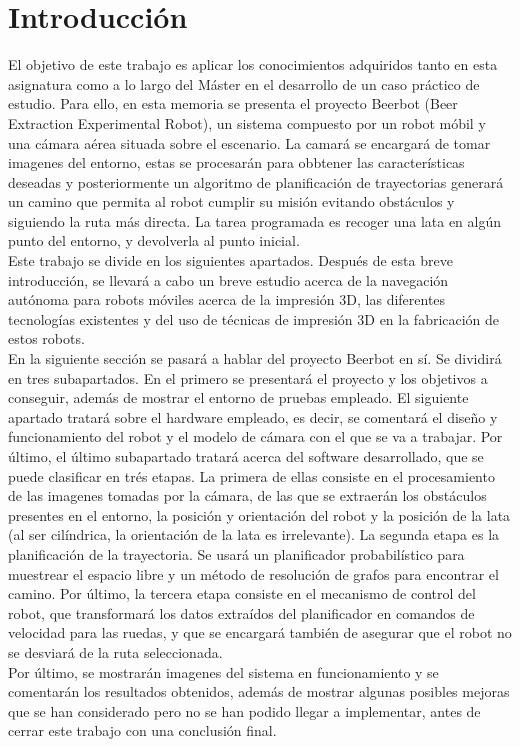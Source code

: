 \chapter{Introducción}
\label{introducción}

El objetivo de este trabajo es aplicar los conocimientos adquiridos tanto en esta asignatura como a lo largo del Máster en el desarrollo de un caso práctico de estudio. Para ello, en esta memoria se presenta el proyecto Beerbot (Beer Extraction Experimental Robot), un sistema compuesto por un robot móbil y una cámara aérea situada sobre el escenario. La camará se encargará de tomar imagenes del entorno, estas se procesarán para obbtener las características deseadas y posteriormente un algoritmo de planificación de trayectorias generará un camino que permita al robot cumplir su misión evitando obstáculos y siguiendo la ruta más directa. La tarea programada es recoger una lata en algún punto del entorno, y devolverla al punto inicial.\\

Este trabajo se divide en los siguientes apartados. Después de esta breve introducción, se llevará a cabo un breve estudio acerca de la navegación autónoma para robots móviles acerca de la impresión 3D, las diferentes tecnologías existentes y del uso de técnicas de impresión 3D en la fabricación de estos robots.\\

En la siguiente sección se pasará a hablar del proyecto Beerbot en sí. Se dividirá en tres subapartados. En el primero se presentará el proyecto y los objetivos a conseguir, además de mostrar el entorno de pruebas empleado. El siguiente apartado tratará sobre el hardware empleado, es decir, se comentará el diseño y funcionamiento del robot y el modelo de cámara con el que se va a trabajar. Por último, el último subapartado tratará acerca del software desarrollado, que se puede clasificar en trés etapas. La primera de ellas consiste en el procesamiento de las imagenes tomadas por la cámara, de las que se extraerán los obstáculos presentes en el entorno, la posición y orientación del robot y la posición de la lata (al ser cilíndrica, la orientación de la lata es irrelevante). La segunda etapa es la planificación de la trayectoria. Se usará un planificador probabilístico para muestrear el espacio libre y un método de resolución de grafos para encontrar el camino. Por último, la tercera etapa consiste en el mecanismo de control del robot, que transformará los datos extraídos del planificador en comandos de velocidad para las ruedas, y que se encargará también de asegurar que el robot no se desviará de la ruta seleccionada.\\

Por último, se mostrarán imagenes del sistema en funcionamiento y se comentarán los resultados obtenidos, además de mostrar algunas posibles mejoras que se han considerado pero no se han podido llegar a implementar, antes de cerrar este trabajo con una conclusión final.\\
